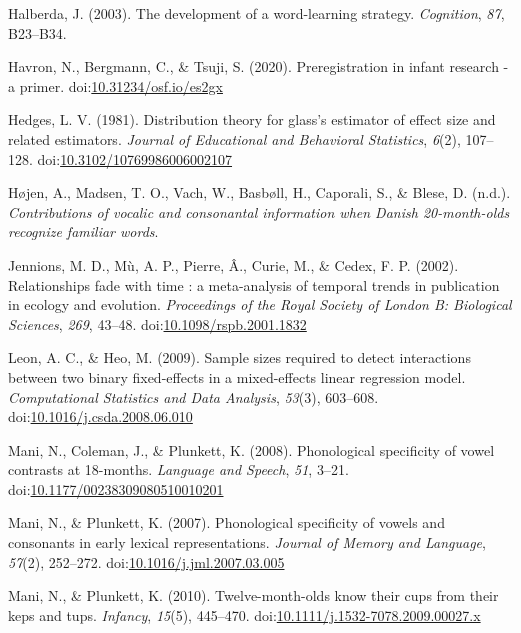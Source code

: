 \documentclass[man, noextraspace]{apa6}
\begin{document}
\leavevmode\hypertarget{ref-Halberda2003}{}%
Halberda, J. (2003). The development of a word-learning strategy. \emph{Cognition}, \emph{87}, B23--B34.

\leavevmode\hypertarget{ref-Havron}{}%
Havron, N., Bergmann, C., \& Tsuji, S. (2020). Preregistration in infant research - a primer. doi:\href{https://doi.org/10.31234/osf.io/es2gx}{10.31234/osf.io/es2gx}

\leavevmode\hypertarget{ref-Hedges1981}{}%
Hedges, L. V. (1981). Distribution theory for glass's estimator of effect size and related estimators. \emph{Journal of Educational and Behavioral Statistics}, \emph{6}(2), 107--128. doi:\href{https://doi.org/10.3102/10769986006002107}{10.3102/10769986006002107}

\leavevmode\hypertarget{ref-Hojen}{}%
Højen, A., Madsen, T. O., Vach, W., Basbøll, H., Caporali, S., \& Blese, D. (n.d.). \emph{Contributions of vocalic and consonantal information when Danish 20-month-olds recognize familiar words}.

\leavevmode\hypertarget{ref-Jennions2002}{}%
Jennions, M. D., Mù, A. P., Pierre, Â., Curie, M., \& Cedex, F. P. (2002). Relationships fade with time : a meta-analysis of temporal trends in publication in ecology and evolution. \emph{Proceedings of the Royal Society of London B: Biological Sciences}, \emph{269}, 43--48. doi:\href{https://doi.org/10.1098/rspb.2001.1832}{10.1098/rspb.2001.1832}

\leavevmode\hypertarget{ref-Leon2009}{}%
Leon, A. C., \& Heo, M. (2009). Sample sizes required to detect interactions between two binary fixed-effects in a mixed-effects linear regression model. \emph{Computational Statistics and Data Analysis}, \emph{53}(3), 603--608. doi:\href{https://doi.org/10.1016/j.csda.2008.06.010}{10.1016/j.csda.2008.06.010}

\leavevmode\hypertarget{ref-Mani2008}{}%
Mani, N., Coleman, J., \& Plunkett, K. (2008). Phonological specificity of vowel contrasts at 18-months. \emph{Language and Speech}, \emph{51}, 3--21. doi:\href{https://doi.org/10.1177/00238309080510010201}{10.1177/00238309080510010201}

\leavevmode\hypertarget{ref-Mani2007}{}%
Mani, N., \& Plunkett, K. (2007). Phonological specificity of vowels and consonants in early lexical representations. \emph{Journal of Memory and Language}, \emph{57}(2), 252--272. doi:\href{https://doi.org/10.1016/j.jml.2007.03.005}{10.1016/j.jml.2007.03.005}

\leavevmode\hypertarget{ref-Mani2010kepstups}{}%
Mani, N., \& Plunkett, K. (2010). Twelve-month-olds know their cups from their keps and tups. \emph{Infancy}, \emph{15}(5), 445--470. doi:\href{https://doi.org/10.1111/j.1532-7078.2009.00027.x}{10.1111/j.1532-7078.2009.00027.x}
\end{document}
